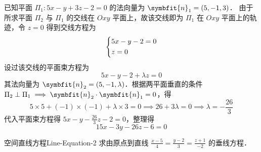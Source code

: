 \begin{solution}
    已知平面 $\Pi_1: 5x - y + 3z - 2 = 0$ 的法向量为 $\symbfit{n}_1 = (5, -1, 3)$．
    由于所求平面 $\Pi_2$ 与 $\Pi_1$ 的交线在 $Oxy$ 平面上，故该交线即为 $\Pi_1$ 在 $Oxy$ 平面上的轨迹，令 $z = 0$ 得到交线方程为
    \begin{equation}
        \begin{dcases}
            5x - y - 2 = 0 \\
            z = 0
        \end{dcases}
    \end{equation}
    设过该交线的平面束方程为
    \begin{equation}
        5x - y - 2 + \lambda z = 0
    \end{equation}
    其法向量为 $\symbfit{n}_2 = (5, -1, \lambda)$．根据两平面垂直的条件 $\Pi_2 \perp \Pi_1 \implies \symbfit{n}_2 \cdot \symbfit{n}_1 = 0$，得
    \begin{equation}
        5 \times 5 + (-1) \times (-1) + \lambda \times 3 = 0 \implies 26 + 3\lambda = 0 \implies \lambda = -\frac{26}{3}
    \end{equation}
    代入平面束方程得 $5x - y - \frac{26}{3}z - 2 = 0$，整理得
    \begin{equation}
        \boxed{15x - 3y - 26z - 6 = 0}
    \end{equation}
\end{solution}

\begin{problem}{空间直线方程}{Line-Equation-2}
    求由原点到直线 $\frac{x-5}{4} = \frac{y-2}{3} = \frac{z+1}{-2}$ 的垂线方程．
\end{problem}

